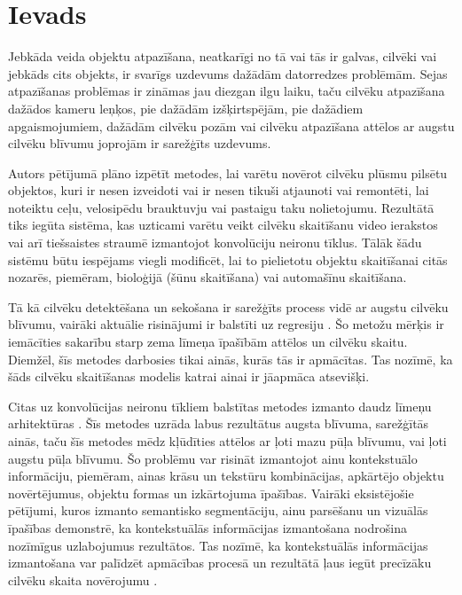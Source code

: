 \chapter{Ievads}
Jebkāda veida objektu atpazīšana, neatkarīgi no tā vai tās ir galvas, cilvēki vai jebkāds cits objekts, ir svarīgs uzdevums dažādām datorredzes problēmām. Sejas atpazīšanas problēmas ir zināmas jau diezgan ilgu laiku, taču cilvēku atpazīšana dažādos kameru leņķos, pie dažādām izšķirtspējām, pie dažādiem apgaismojumiem, dažādām cilvēku pozām vai cilvēku atpazīšana attēlos ar augstu cilvēku blīvumu joprojām ir sarežģīts uzdevums.

Autors pētījumā plāno izpētīt metodes, lai varētu novērot cilvēku plūsmu pilsētu objektos, kuri ir nesen izveidoti vai ir nesen tikuši atjaunoti vai remontēti, lai noteiktu ceļu, velosipēdu brauktuvju vai pastaigu taku nolietojumu. Rezultātā tiks iegūta sistēma, kas uzticami varētu veikt cilvēku skaitīšanu video ierakstos vai arī tiešsaistes straumē izmantojot konvolūciju neironu tīklus. Tālāk šādu sistēmu būtu iespējams viegli modificēt, lai to pielietotu objektu skaitīšanai citās nozarēs, piemēram, bioloģijā (šūnu skaitīšana) vai automašīnu skaitīšana.

Tā kā cilvēku detektēšana un sekošana ir sarežģīts process vidē ar augstu cilvēku blīvumu, vairāki aktuālie risinājumi ir balstīti uz regresiju \cite{chen2012feature,chen2013cumulative}. Šo metožu mērķis ir iemācīties sakarību starp zema līmeņa īpašībām attēlos un cilvēku skaitu. Diemžēl, šīs metodes darbosies tikai ainās, kurās tās ir apmācītas. Tas nozīmē, ka šāds cilvēku skaitīšanas modelis katrai ainai ir jāapmāca atsevišķi.

Citas uz konvolūcijas neironu tīkliem balstītas metodes izmanto daudz līmeņu arhitektūras \cite{zhang2016single,onoro2016towards}. Šīs metodes uzrāda labus rezultātus augsta blīvuma, sarežģītās ainās, taču šīs metodes mēdz kļūdīties attēlos ar ļoti mazu pūļa blīvumu, vai ļoti augstu pūļa blīvumu. Šo problēmu var risināt izmantojot ainu kontekstuālo informāciju, piemēram, ainas krāsu un tekstūru kombinācijas, apkārtējo objektu novērtējumus, objektu formas un izkārtojuma īpašības. Vairāki eksistējošie pētījumi, kuros izmanto semantisko segmentāciju, ainu parsēšanu un vizuālās īpašības demonstrē, ka kontekstuālās informācijas izmantošana nodrošina nozīmīgus uzlabojumus rezultātos. Tas nozīmē, ka kontekstuālās informācijas izmantošana var palīdzēt apmācības procesā un rezultātā ļaus iegūt precīzāku cilvēku skaita novērojumu \cite{sindagi2017generating}. 

